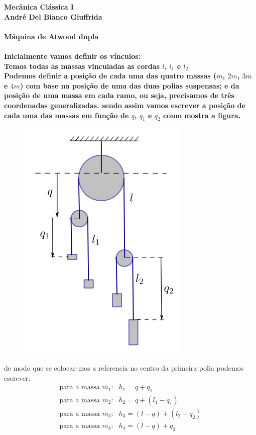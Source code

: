 \documentclass[a4paper,12pt]{exam}
\begin{document}
\begingroup 
	  \bf \Large Mecânica Clássica I\\
	  \indent \normalsize André Del Bianco Giuffrida
	\endgroup
	\\ \quad
	\\
	Máquina de Atwood dupla
	\\ \\
	Inicialmente vamos definir os vínculos:\\
	Temos todas as massas vinculadas as cordas $l$, $l_1$ e $l_2$ \\
	Podemos definir a posição de cada uma das quatro massas ($m$, $2m$, $3m$ e $4m$) com base na posição de uma das duas polias suspensas;
	e da posição de uma massa em cada ramo, ou seja, precisamos de três coordenadas generalizadas.
	sendo assim vamos escrever a posição de cada uma das massas em função de $q$, $q_1$ e $q_2$ como mostra a figura.

	\begin{figure}[h]
		\centering
		\includegraphics[scale=0.5]{Atwoood.png}
	\end{figure}
	
	de modo que se colocar-mos a referencia no centro da primeira polia podemos escrever:
	\[
	\begin{array}{ll}
	\text{para a massa } m_1 \text{:} & h_1 = q+q_1 \\
	\text{para a massa } m_2 \text{:} & h_2 = q+(l_1 - q_1) \\
	\text{para a massa } m_3 \text{:} & h_3 = (l-q)+(l_2-q_2) \\
	\text{para a massa } m_4 \text{:} & h_4 = (l-q)+q_2 \\ 
	\end{array}
	\]
	
\end{document}
